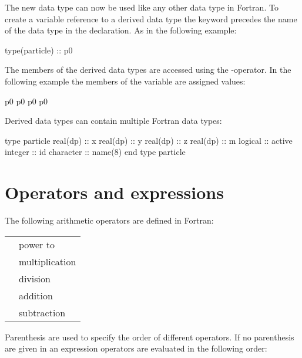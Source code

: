 The new data type can now be used like any other data type in Fortran. To create a variable reference to a derived data type the  keyword precedes the name of the data type in the declaration. As in the following example:

\begin{fortrancodeenv}
type(particle) :: p0
\end{fortrancodeenv}

The members of the derived data types are accessed using the \fkeyw{\%}-operator. In the following example the members of the variable  are assigned values:

\begin{fortrancodeenv}
p0 %
p0 %
p0 %
p0 %
\end{fortrancodeenv}

Derived data types can contain multiple Fortran data types:

\begin{fortrancodeenv}
type particle
    real(dp)  :: x
    real(dp)  :: y
    real(dp)  :: z
    real(dp)  :: m
    logical   :: active
    integer   :: id
    character :: name(8)
end type particle
\end{fortrancodeenv}

\section{Operators and expressions}

The following arithmetic operators are defined in Fortran:

\vspace{5mm}
\begin{tabular}{ll}
  \foper{**} & power to \\
  \foper{*} & multiplication \\
  \foper{/} & division \\
  \foper{+} & addition \\
  \foper{-} & subtraction \\
\end{tabular}
\vspace{5mm}

Parenthesis are used to specify the order of different operators. If no parenthesis are given in an expression operators are evaluated in the following order:

